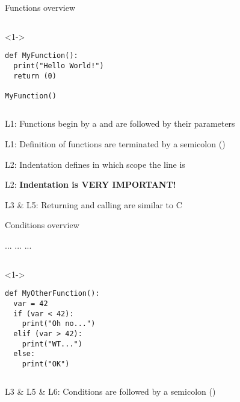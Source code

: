 
\begin{frame}[fragile]{Functions overview}


  \begin{columns}[onlytextwidth]
    \begin{column}{\textwidth}
      \begin{onlyenv}<1->
        \begin{lstlisting}[style=python]
def MyFunction():
  print("Hello World!")
  return (0)

MyFunction() \end{lstlisting}
      \end{onlyenv}
    \end{column}
  \end{columns}

   L1: Functions begin by a  and are followed by their parameters

   L1: Definition of functions are terminated by a semicolon (\TTBF{:})

   L2: Indentation defines in which scope the line is

   L2: \textbf{Indentation is VERY IMPORTANT!}

   L3 \& L5: Returning and calling are similar to C

\end{frame}




\begin{frame}[fragile]{Conditions overview}

   ...  ...  ...

  \begin{columns}[onlytextwidth]
    \begin{column}{\textwidth}
      \begin{onlyenv}<1->
        \begin{lstlisting}[style=python]
def MyOtherFunction():
  var = 42
  if (var < 42):
    print("Oh no...")
  elif (var > 42):
    print("WT...")
  else:
    print("OK") \end{lstlisting}
      \end{onlyenv}
    \end{column}
  \end{columns}

%
   L3 \& L5 \& L6: Conditions are followed by a semicolon (\TTBF{:})

\end{frame}

